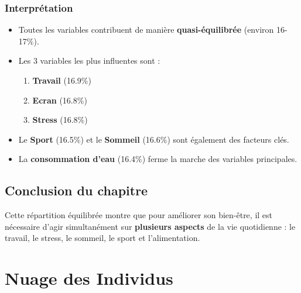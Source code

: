 \documentclass[12pt,a4paper]{book}
\begin{document}
	\subsection{Interprétation}
	
	\begin{itemize}
		\item Toutes les variables contribuent de manière \textbf{quasi-équilibrée} (environ 16-17\%).
		\item Les 3 variables les plus influentes sont :
		\begin{enumerate}
			\item \textbf{Travail} (16.9\%)
			\item \textbf{Ecran} (16.8\%)
			\item \textbf{Stress} (16.8\%)
		\end{enumerate}
		\item Le \textbf{Sport} (16.5\%) et le \textbf{Sommeil} (16.6\%) sont également des facteurs clés.
		\item La \textbf{consommation d'eau} (16.4\%) ferme la marche des variables principales.
	\end{itemize}
	
	\section{Conclusion du chapitre}
	
	\begin{center}
	\end{center}
	
	\vspace{0.5cm}
	
	Cette répartition équilibrée montre que pour améliorer son bien-être, il est nécessaire d'agir simultanément sur \textbf{plusieurs aspects} de la vie quotidienne : le travail, le stress, le sommeil, le sport et l'alimentation.
	
	\chapter{Nuage des Individus}
	
\end{document}
